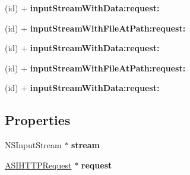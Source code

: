 \begin{DoxyCompactItemize}
\item 
\hypertarget{interface_a_s_i_input_stream_a3c83c62eb777c3bc0920a18f552cc4b9}{
(id) + {\bfseries input\-Stream\-With\-Data\-:request\-:}}
\label{interface_a_s_i_input_stream_a3c83c62eb777c3bc0920a18f552cc4b9}

\item 
\hypertarget{interface_a_s_i_input_stream_a1035f560fa6ddef148455388de269472}{
(id) + {\bfseries input\-Stream\-With\-File\-At\-Path\-:request\-:}}
\label{interface_a_s_i_input_stream_a1035f560fa6ddef148455388de269472}

\item 
\hypertarget{interface_a_s_i_input_stream_a3c83c62eb777c3bc0920a18f552cc4b9}{
(id) + {\bfseries input\-Stream\-With\-Data\-:request\-:}}
\label{interface_a_s_i_input_stream_a3c83c62eb777c3bc0920a18f552cc4b9}

\item 
\hypertarget{interface_a_s_i_input_stream_a1035f560fa6ddef148455388de269472}{
(id) + {\bfseries input\-Stream\-With\-File\-At\-Path\-:request\-:}}
\label{interface_a_s_i_input_stream_a1035f560fa6ddef148455388de269472}

\item 
\hypertarget{interface_a_s_i_input_stream_a3c83c62eb777c3bc0920a18f552cc4b9}{
(id) + {\bfseries input\-Stream\-With\-Data\-:request\-:}}
\label{interface_a_s_i_input_stream_a3c83c62eb777c3bc0920a18f552cc4b9}

\end{DoxyCompactItemize}
\subsection*{\-Properties}
\begin{DoxyCompactItemize}
\item 
\hypertarget{interface_a_s_i_input_stream_ac09491abd1aacf8280b2bee993a6cc6d}{
\-N\-S\-Input\-Stream $\ast$ {\bfseries stream}}
\label{interface_a_s_i_input_stream_ac09491abd1aacf8280b2bee993a6cc6d}

\item 
\hypertarget{interface_a_s_i_input_stream_a1e06728944bae0bdf5cd011c5a1901df}{
\hyperlink{interface_a_s_i_h_t_t_p_request}{\-A\-S\-I\-H\-T\-T\-P\-Request} $\ast$ {\bfseries request}}
\label{interface_a_s_i_input_stream_a1e06728944bae0bdf5cd011c5a1901df}

\end{DoxyCompactItemize}


